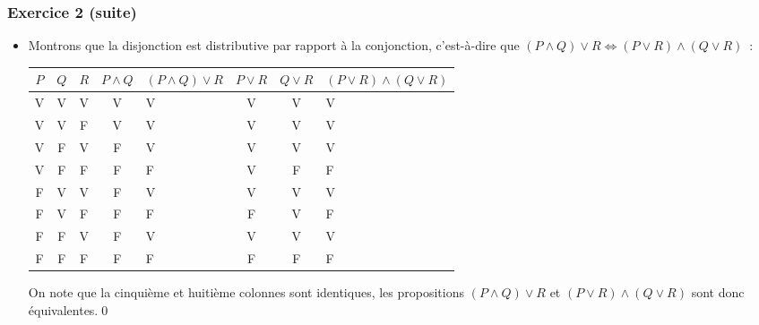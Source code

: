 \documentclass[10pt,notheorems]{beamer}
\theoremstyle{plain}
\theoremstyle{definition} %
\begin{document}
\begin{frame}
  \frametitle{Exercice 2 (suite)}
  \fontsize{8}{10}\selectfont

  \begin{itemize}
    
  \item Montrons que la disjonction est distributive par rapport à la conjonction, c'est-à-dire que $(P\land Q)\lor R \Leftrightarrow (P\lor R) \land (Q\lor R)$~:\newline
  \begin{table}[H]
    \centering
    \begin{tabular}[H]{|ccc|cgccg|}
      \hline
      $P$ & $Q$ & $R$ & $P\land Q$ & $(P\land Q)\lor R$ & $P\lor R$ & $Q \lor R$ & $(P\lor R)\land (Q \lor R)$ \\ \hline
      V & V & V & V & V & V & V & V \\
      V & V & F & V & V & V & V & V \\
      V & F & V & F & V & V & V & V \\
      V & F & F & F & F & V & F & F \\
      F & V & V & F & V & V & V & V \\
      F & V & F & F & F & F & V & F \\
      F & F & V & F & V & V & V & V \\
      F & F & F & F & F & F & F & F \\
      \hline\hline
    \end{tabular}
  \end{table}

  \bigskip

  On note que la cinquième et huitième colonnes sont identiques, les propositions $(P\land Q)\lor R$ et $(P\lor R) \land (Q\lor R)$ sont donc équivalentes.\qed 
    
  \end{itemize}
  
\end{frame}
\end{document}
